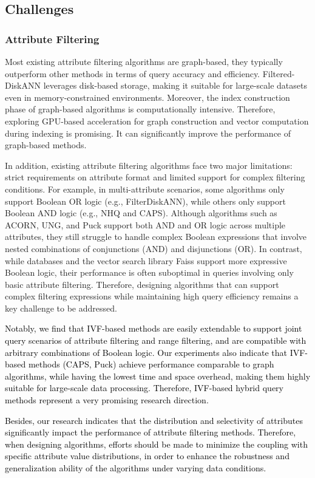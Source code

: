 \documentclass[sigconf, nonacm, pdfa]{acmart}
\begin{document}
{	\subsection{Challenges}
	\subsubsection{Attribute Filtering}
	Most existing attribute filtering algorithms are graph-based, they typically outperform other methods in terms of query accuracy and efficiency. Filtered-DiskANN leverages disk-based storage, making it suitable for  large-scale datasets even in memory-constrained environments. Moreover, the index construction phase of graph-based algorithms is computationally intensive. Therefore, exploring GPU-based acceleration for graph construction and vector computation during indexing is promising. It can significantly improve the performance of graph-based methods.
	
In addition, existing attribute filtering algorithms face two major limitations: strict requirements on attribute format and limited support for complex filtering conditions. 
For example, in multi-attribute scenarios, some algorithms only support Boolean OR logic (e.g., FilterDiskANN), while others only support Boolean AND logic (e.g., NHQ and CAPS). Although algorithms such as ACORN, UNG, and Puck support both AND and OR logic across multiple attributes, they still struggle to handle complex Boolean expressions that involve nested combinations of conjunctions (AND) and disjunctions (OR). In contrast, while databases and the vector search library Faiss support more expressive Boolean logic, their performance is often suboptimal in queries involving only basic attribute filtering.
Therefore, designing algorithms that can support complex filtering expressions while maintaining high query efficiency remains a key challenge to be addressed. 

\textcolor{black}{Notably, we find that IVF-based methods are easily extendable to support joint query scenarios of attribute filtering and range filtering, and are compatible with arbitrary combinations of Boolean logic. Our experiments also indicate that IVF-based methods (CAPS, Puck) achieve performance comparable to graph algorithms, while having the lowest time and space overhead, making them highly suitable for large-scale data processing. Therefore, IVF-based hybrid query methods represent a very promising research direction.}
		
		
	\textcolor{black}{
	Besides, our research indicates that the distribution and selectivity of attributes significantly impact the performance of attribute filtering methods. Therefore, when designing algorithms, efforts should be made to minimize the coupling with specific attribute value distributions, in order to enhance the robustness and generalization ability of the algorithms under varying data conditions.}
	



}
\end{document}
